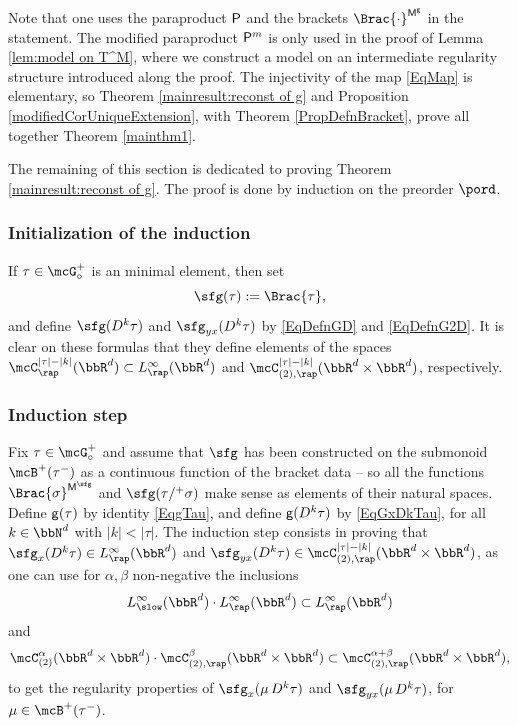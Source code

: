 Note that one uses the paraproduct $\sf P$ and the brackets $\Brac{\cdot}^{\sf M^g}$ in the statement. The modified paraproduct ${\sf P}^m$ is only used in the proof of Lemma \ref{lem:model on T^M}, where we construct a model on an intermediate regularity structure introduced along the proof. The injectivity of the map \eqref{EqMap} is elementary, so Theorem \ref{mainresult:reconst of g} and Proposition \ref{modifiedCorUniqueExtension}, with Theorem \ref{PropDefnBracket}, prove all together Theorem \ref{mainthm1}.

The remaining of this section is dedicated to proving Theorem \ref{mainresult:reconst of g}. The proof is done by induction on the preorder $\pord$.

\subsubsection*{Initialization of the induction}
If $\tau\in\mcG_\circ^+$ is an minimal element, then set
\[
\sfg(\tau) := \Brac{\tau},
\]
and define $\sfg(D^k\tau)$ and $\sfg_{yx}(D^k\tau)$ by \eqref{EqDefnGD} and \eqref{EqDefnG2D}. It is clear on these formulas that they define elements of the spaces $\mcC^{\vert\tau\vert-\vert k\vert}_\rap(\bbR^d)\subset L^\infty_\rap(\bbR^d)$ and $\mcC^{\vert\tau\vert-\vert k\vert}_{(2),\rap}(\bbR^d\times\bbR^d)$, respectively.

\subsubsection*{Induction step}
Fix $\tau\in\mcG_\circ^+$ and assume that $\sfg$ has been constructed on the submonoid $\mcB^+(\tau^-)$ as a continuous function of the bracket data -- so all the functions $\Brac{\sigma}^{{\sf M}^\sfg}$ and ${\sfg}(\tau/^+\sigma)$ make sense as elements of their natural spaces. Define ${\sf g}(\tau)$ by identity \eqref{EqgTau}, and define ${\sf g}(D^k\tau)$ by \eqref{EqGxDkTau}, for all $k\in\bbN^d$ with $\vert k\vert<\vert\tau\vert$. The induction step consists in proving that $\sfg_x(D^k\tau)\in L_\rap^\infty(\bbR^d)$ and ${\sfg}_{yx}(D^k\tau)\in\mcC^{|\tau|-|k|}_{(2),\rap}(\bbR^d\times\bbR^d)$, as one can use for $\alpha,\beta$ non-negative the inclusions
\[
L_\slow^\infty(\bbR^d)\cdot L_\rap^\infty(\bbR^d)\subset L_\rap^\infty(\bbR^d)
\]
and
\[
\mcC_{(2)}^\alpha(\bbR^d\times\bbR^d)\cdot\mcC_{(2),\rap}^\beta(\bbR^d\times\bbR^d)\subset\mcC_{(2),\rap}^{\alpha+\beta}(\bbR^d\times\bbR^d),
\]
to get the regularity properties of $\sfg_x(\mu\,D^k\tau)$ and $\sfg_{yx}(\mu\,D^k\tau)$, for $\mu\in\mcB^+(\tau^-)$.

